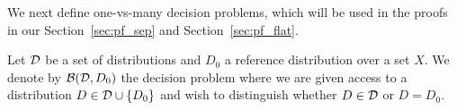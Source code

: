 We next define one-vs-many decision problems, which will be used in the proofs in our Section~\ref{sec:pf_sep} and Section~\ref{sec:pf_flat}.
\begin{defn}
Let $\mathcal{D}$ be a set of distributions and $D_0$ a reference distribution over a set $X$. We denote by $\mathcal{B}(\mathcal{D}, D_0)$ the decision problem where we are given access to a distribution $D \in \mathcal{D} \cup \{D_0\}$ and wish to distinguish whether $D \in \mathcal{D}$ or $D = D_0$.
\end{defn}

